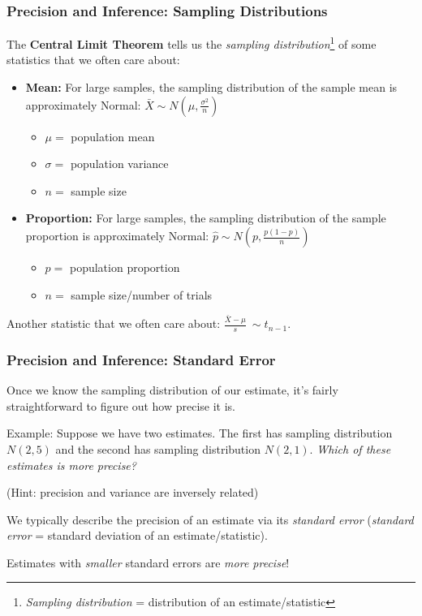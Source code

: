 \documentclass[12pt, 
hyperref={colorlinks=true, linkcolor=blue, urlcolor=cyan}]{beamer}
\begin{document}
\begin{frame}
\frametitle{Precision and Inference: Sampling Distributions}

The \textbf{Central Limit Theorem} tells us the \textit{sampling distribution}\footnote[frame]{\textit{Sampling distribution} = distribution of an estimate/statistic} of some statistics that we often care about: \vspace{-0.3cm}

\begin{itemize}
\item \textbf{Mean:} For large samples, \color{blue}the sampling distribution of the sample mean is approximately Normal\color{black}: $\bar{X} \sim N(\mu,\frac{\sigma^2}{n})$
	\begin{itemize}
	\item $\mu =$ population mean
	\item $\sigma =$ population variance
	\item $n =$ sample size
	\end{itemize}
\item \textbf{Proportion:}  For large samples, \color{blue}the sampling distribution of the sample proportion is approximately Normal\color{black}: $\hat{p} \sim N(p,\frac{p(1-p)}{n})$
	\begin{itemize}
	\item $p =$ population proportion
	\item $n =$ sample size/number of trials
	\end{itemize}
\end{itemize} \vspace{-0.2cm}
Another statistic that we often care about: $\frac{\bar{X}-\mu}{s} ~\sim t_{n-1}$.
\end{frame}

\begin{frame}
\frametitle{Precision and Inference: Standard Error}

Once we know the sampling distribution of our estimate, it's fairly straightforward to figure out how precise it is.

\color{blue} Example: \color{black} Suppose we have two estimates. The first has sampling distribution $N(2,5)$ and the second has sampling distribution $N(2,1)$. \textit{Which of these estimates is more precise?}

\pause
\begin{footnotesize} (Hint: precision and variance are inversely related) \end{footnotesize}

\pause
We typically describe the precision of an estimate via its \textit{standard error} (\textit{standard error} = standard deviation of an estimate/statistic).

Estimates with \textit{smaller} standard errors are \textit{more precise}!
\end{frame}
\end{document}
